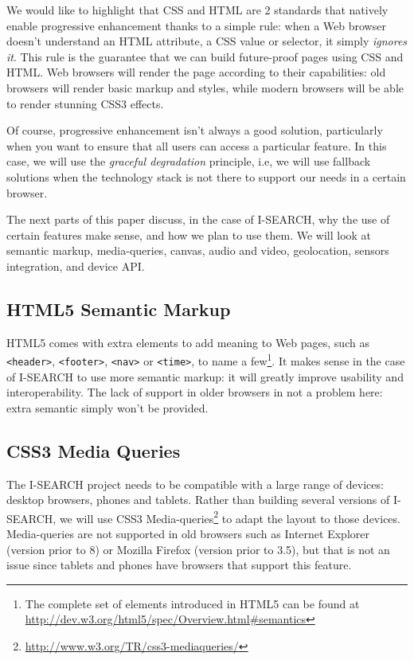 \documentclass[runningheads,a4paper]{llncs} \usepackage[utf8]{inputenc}
\begin{document}
We would like to highlight that CSS and HTML are 2 standards that natively enable progressive enhancement thanks to a simple rule: when a Web browser doesn't understand an HTML attribute, a CSS value or selector, it simply \emph{ignores it}. This rule is the guarantee that we can build future-proof pages using CSS and HTML. Web browsers will render the page according to their capabilities: old browsers will render basic markup and styles, while modern browsers will be able to render stunning CSS3 effects.

Of course, progressive enhancement isn't always a good solution, particularly when you want to ensure that all users can access a particular feature. In this case, we will use the \emph{graceful degradation} principle, i.e, we will use fallback solutions when the technology stack is not there to support our needs in a certain browser. 

The next parts of this paper discuss, in the case of I-SEARCH, why the use of certain features make sense, and how we plan to use them. We will look at semantic markup, media-queries, canvas, audio and video, geolocation, sensors integration, and device API.

\subsection{HTML5 Semantic Markup} 

HTML5 comes with extra elements to add meaning to Web pages, such as {\tt <header>}, {\tt <footer>}, {\tt <nav>} or {\tt <time>}, to name a few\footnote{The complete set of elements introduced in HTML5 can be found at \url{http://dev.w3.org/html5/spec/Overview.html\#semantics}}. It makes sense in the case of I-SEARCH to use more semantic markup: it will greatly improve usability and interoperability\cite{}.
The lack of support in older browsers in not a problem here: extra semantic simply won't be provided.

\subsection{CSS3 Media Queries} 

The I-SEARCH project needs to be compatible with a large range of devices: desktop browsers, phones and tablets. Rather than building several versions of I-SEARCH, we will use CSS3 Media-queries\footnote{\url{http://www.w3.org/TR/css3-mediaqueries/}} to adapt the layout to those devices. Media-queries are not supported in old browsers such as Internet Explorer (version prior to 8) or Mozilla Firefox (version prior to 3.5), but that is not an issue since tablets and phones have browsers that support this feature.
\end{document}
